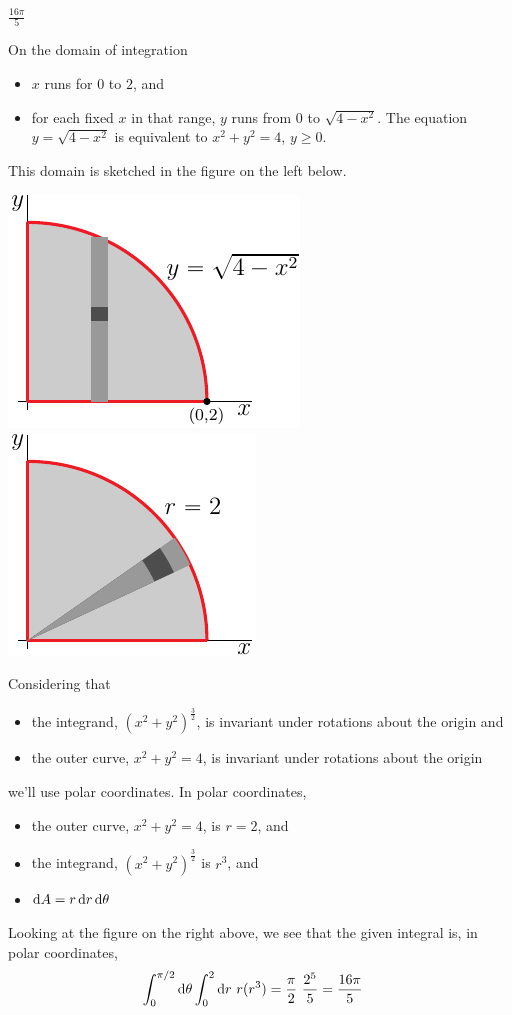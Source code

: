 \begin{answer}
$\frac{16\pi}{5}$
\end{answer}

\begin{solution}
On the domain of integration
\begin{itemize}
\item
$x$ runs for $0$ to $2$, and

\item
for each fixed $x$ in that range, $y$ runs from $0$ to $\sqrt{4-x^2}$.
The equation $y=\sqrt{4-x^2}$ is equivalent to $x^2+y^2=4$, $y\ge 0$.
\end{itemize}
This domain is sketched in the figure on the left below.
\begin{center}
     \includegraphics{fig/OE06A_7v.pdf}\qquad
     \includegraphics{fig/OE06A_7p.pdf}
\end{center}
Considering that
\begin{itemize}
\item
the integrand, ${(x^2+y^2)}^{\frac{3}{2}}$, is invariant under rotations 
about the origin and
\item
the outer curve, $x^2+y^2=4$, is invariant under rotations about the origin \end{itemize}
we'll use polar coordinates. 
In polar coordinates, 
\begin{itemize}
\item
the outer curve, $x^2+y^2=4$, is $r=2$, and
\item 
the integrand, ${(x^2+y^2)}^{\frac{3}{2}}$ is $r^3$, and
\item
$\mathrm{d}A=r\,\mathrm{d}r\,\mathrm{d}\theta$
\end{itemize}
Looking at the figure on the right above, we see that the given integral
is, in polar coordinates,
\begin{align*}
\int_0^{\pi/2}\mathrm{d}\theta\int_0^2\mathrm{d}r\ r (r^3)
&=\frac{\pi}{2}\ \frac{2^5}{5}
=\frac{16\pi}{5}
\end{align*}
\end{solution}


